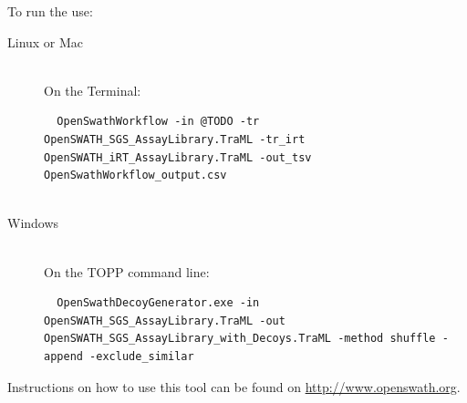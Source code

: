 To run the  use:

\begin{description}
  \item[Linux or Mac] \hfill \\
    On the Terminal:
    \begin{lstlisting}
  OpenSwathWorkflow -in @TODO -tr OpenSWATH_SGS_AssayLibrary.TraML -tr_irt OpenSWATH_iRT_AssayLibrary.TraML -out_tsv OpenSwathWorkflow_output.csv
  
  \end{lstlisting}
  \item[Windows] \hfill \\
    On the TOPP command line:
    \begin{lstlisting}
  OpenSwathDecoyGenerator.exe -in OpenSWATH_SGS_AssayLibrary.TraML -out OpenSWATH_SGS_AssayLibrary_with_Decoys.TraML -method shuffle -append -exclude_similar
  \end{lstlisting}
\end{description}


 
Instructions on how to use this tool can be found on \url{http://www.openswath.org}.

